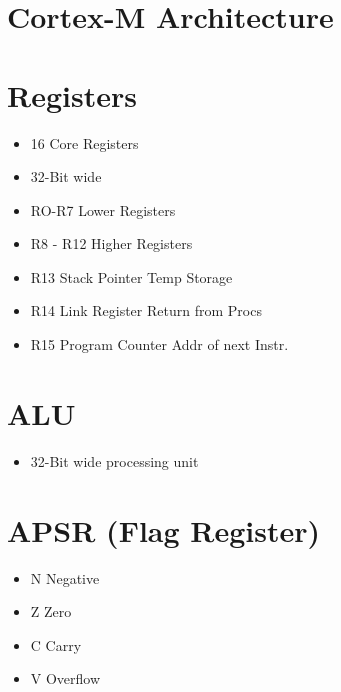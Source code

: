 \section{Cortex-M Architecture}

\section*{Registers}
\begin{itemize}
  \item 16 Core Registers
  \item 32-Bit wide
  \item RO-R7 Lower Registers
  \item R8 - R12 Higher Registers
  \item R13 Stack Pointer Temp Storage
  \item R14 Link Register Return from Procs
  \item R15 Program Counter Addr of next Instr.
\end{itemize}

\section*{ALU}
\begin{itemize}
  \item 32-Bit wide processing unit
\end{itemize}

\section*{APSR (Flag Register)}
\begin{itemize}
  \item N Negative
  \item Z Zero
  \item C Carry
  \item V Overflow
\end{itemize}

